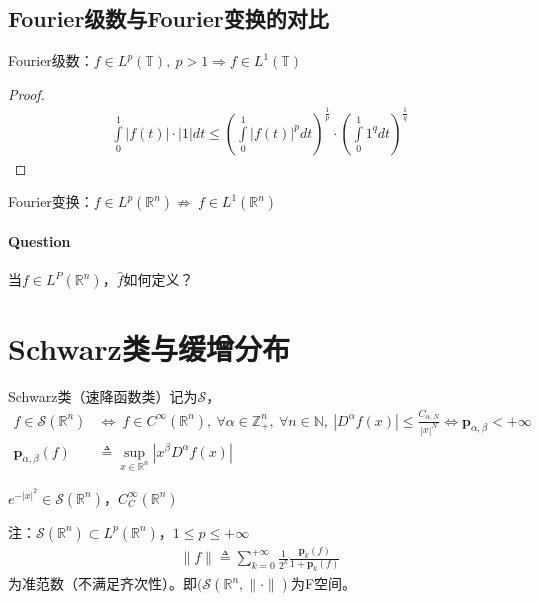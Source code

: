 \subsection{Fourier级数与Fourier变换的对比}
Fourier级数：$f\in L^p(\mathbb{T}),\ p>1 \Rightarrow f\in L^1(\mathbb{T})$
\begin{proof}
    \begin{align*}
        \int\limits_0^1 |f(t)|\cdot |1| dt \leqslant \left(\int\limits_0^1 |f(t)|^p dt \right)^{\frac{1}{p}} \cdot \left(\int\limits_0^1 1^q dt \right)^{\frac{1}{q}}
    \end{align*}
\end{proof}

Fourier变换：$f\in L^p(\mathbb{R}^n) \nRightarrow\ f\in L^1(\mathbb{R}^n)$

\paragraph{Question} 当$f\in L^P(\mathbb{R}^n)$，$\hat{f}$如何定义？


\newpage
\section{Schwarz类与缓增分布}
\begin{definition}
    Schwarz类（速降函数类）记为$\mathcal{S}$，
    \begin{align*}
        f\in \mathcal{S}(\mathbb{R}^n) &\Longleftrightarrow\ f\in C^{\infty}(\mathbb{R}^n),\ \forall \alpha\in\mathbb{Z}_+^n,\ \forall n\in \mathbb{N},\ |D^{\alpha} f(x)| \leqslant \frac{C_{\alpha,N}}{|x|^N} \Longleftrightarrow \boldsymbol{p}_{\alpha,\beta} < +\infty \\
        \boldsymbol{p}_{\alpha,\beta}(f) &\triangleq \sup\limits_{x\in\mathbb{R}^n} |x^{\beta} D^{\alpha} f(x)|
    \end{align*}
\end{definition}

\begin{example}
    $e^{-|x|^2} \in\mathcal{S}(\mathbb{R}^n)$，$C_{C}^{\infty}(\mathbb{R}^n)$
\end{example}

注：$\mathcal{S}(\mathbb{R}^n) \subset L^p(\mathbb{R}^n)$，$1\leqslant p\leqslant +\infty$
\begin{align*}
    \|f\| \triangleq \sum\limits_{k=0}^{+\infty} \frac{1}{2^k} \frac{\boldsymbol{p}_k(f)}{1 + \boldsymbol{p}_k(f)}
\end{align*}
为准范数（不满足齐次性）。即$(\mathscr{S}(\mathbb{R}^n,\|\cdot\|)$为F空间。

